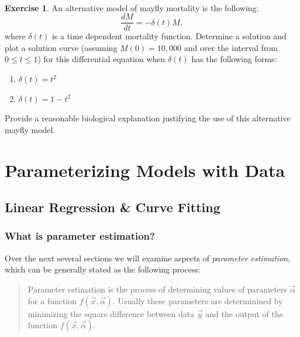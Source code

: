 \documentclass[
]{book}
\theoremstyle{definition}
\theoremstyle{definition}
\theoremstyle{definition}
\newtheorem{exercise}{Exercise}[chapter]
\theoremstyle{remark}
\begin{document}
~
\begin{exercise}
\protect\hypertarget{exr:unnamed-chunk-131}{}{\label{exr:unnamed-chunk-131} }An alternative model of mayfly mortality is the following:
\begin{equation}
\displaystyle \frac{dM}{dt} = - \delta(t) M,
\end{equation}
where \(\delta(t)\) is a time dependent mortality function. Determine a solution and plot a solution curve (assuming \(M(0)=10,000\) and over the interval from \(0 \leq t \leq 1\)) for this differential equation when \(\delta(t)\) has the following forms:

\begin{enumerate}
\item $\delta(t) = t^{2}$
\item $\delta(t) = 1-t^{2}$
\end{enumerate}

Provide a reasonable biological explanation justifying the use of this alternative mayfly model.
\end{exercise}

\hypertarget{part-parameterizing-models-with-data}{%
\part{Parameterizing Models with Data}\label{part-parameterizing-models-with-data}}

\hypertarget{linear-regression-08}{%
\chapter{Linear Regression \& Curve Fitting}\label{linear-regression-08}}

\hypertarget{what-is-parameter-estimation}{%
\section{What is parameter estimation?}\label{what-is-parameter-estimation}}

Over the next several sections we will examine aspects of \emph{parameter estimation}, which can be generally stated as the following process:

\begin{quote}
Parameter estimation is the process of determining values of parameters \(\vec{\alpha}\) for a function \(f(\vec{x}, \vec{\alpha})\). Usually these parameters are determinined by minimizing the square difference between data \(\vec{y}\) and the output of the function \(f(\vec{x}, \vec{\alpha})\).
\end{quote}
\end{document}

